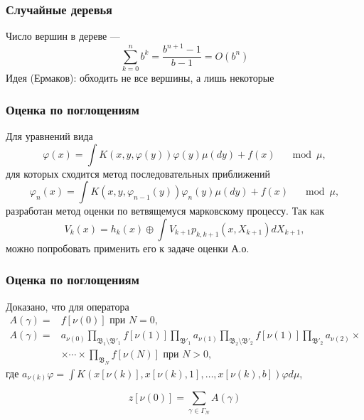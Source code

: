 \documentclass[unicode, notheorems]{beamer}
\newcommand{\vfi}{\varphi}
\begin{document}
\begin{frame}
    \frametitle{Случайные деревья}
    Число вершин в дереве --- $$\sum_{k=0}^n b^k = \frac{b^{n+1} - 1}{b-1} = O(b^n)$$
    Идея (Ермаков): обходить не все вершины, а лишь некоторые
\end{frame}

\begin{frame}
    \frametitle{Оценка по поглощениям}
    Для уравнений вида $$\vfi\left(x\right) = \int K\left(x, y, \vfi\left(y\right)\right)\vfi\left(y\right) \mu\left(dy\right) + f\left(x\right) \quad \mod \mu,$$
    для которых сходится метод последовательных приближений 
    \[
    \vfi_n\left(x\right) = \int K\left(x, y, \vfi_{n-1}\left(y\right)\right)\vfi_n\left(y\right) \mu\left(dy\right) + f\left(x\right) \quad \mod \mu,
    \]
    разработан метод оценки по ветвящемуся марковскому процессу. Так как
    $$
    V_k\left(x\right) = h_k\left(x\right)\oplus \int V_{k+1}p_{k, k+1}\left(x, X_{k+1}\right) dX_{k+1},
    $$
    можно попробовать применить его к задаче оценки А.о.
\end{frame}

\begin{frame}
    \frametitle{Оценка по поглощениям}
    Доказано, что для оператора
    \[
    \begin{aligned}
    A\left(\gamma\right) = &f\left[\nu(0)\right] \text{ при } N=0, \\
    A\left(\gamma\right) = &a_{\nu(0)}\prod_{\mathfrak{B}_1\setminus\mathfrak{B}'_1}f\left[\nu(1)\right]\prod_{\mathfrak{B}'_1}a_{\nu(1)} \prod_{\mathfrak{B}_2\setminus\mathfrak{B}'_2}f\left[\nu(1)\right]\prod_{\mathfrak{B}'_2}a_{\nu(2)} \times \\
    &\times\cdots\times \prod_{\mathfrak{B}_N}f\left[\nu(N)\right] \text{ при } N>0,
    \end{aligned}
    \]
    где $a_{\nu\left(k\right)}\vfi = \int K\left(
            x\left[\nu(k)\right], x\left[\nu(k),1\right], \ldots ,x\left[\nu(k),b\right]
        \right) \vfi d\mu$, 
    \begin{block}{}
    $$z\left[\nu(0)\right] = \sum_{\gamma\in\Gamma_N}A\left(\gamma\right)$$
    \end{block}
\end{frame}
\end{document}
